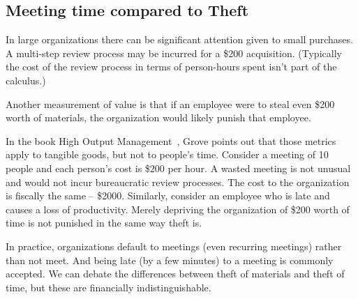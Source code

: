 


\subsection*{Meeting time compared to Theft\label{sec:financial-models-of-communication}}

In large organizations there can be significant attention given to small purchases. A multi-step review process may be incurred for a \$200 acquisition. (Typically the cost of the review process in terms of person-hours spent isn't part of the calculus.)

Another measurement of value is that if an employee were to steal even \$200 worth of materials, the organization would likely punish that employee.

In the book High Output Management~\cite{1995_Grove}, Grove points out that those metrics apply to tangible goods, but not to people's time. Consider a meeting of 10 people and each person's cost is \$200 per hour. 
%
A wasted meeting is not unusual and would not incur bureaucratic review processes. The cost to the organization is fiscally the same -- \$2000. Similarly, consider an employee who is late and causes a loss of productivity. Merely depriving the organization of \$200 worth of time is not punished in the same way theft is.

In practice, organizations default to meetings (even recurring meetings) rather than not meet. And being late (by a few minutes) to a meeting is commonly accepted. 
We can debate the differences between theft of materials and theft of time, but these are financially indistinguishable. 


 
